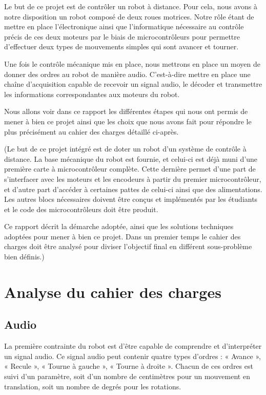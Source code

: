Le but de ce projet est de contrôler un robot à distance. Pour cela, nous avons à notre disposition un robot composé de deux roues motrices. Notre rôle étant de mettre en place l’électronique ainsi que l’informatique nécessaire au contrôle précis de ces deux moteurs par le biais de microcontrôleurs pour permettre d’effectuer deux types de mouvements simples qui sont avancer et tourner. 

Une fois le contrôle mécanique mis en place, nous mettrons en place un moyen de donner des ordres au robot de manière audio. C’est-à-dire mettre en place une chaîne d’acquisition capable de recevoir un signal audio, le décoder et transmettre les informations correspondantes aux moteurs du robot. 

Nous allons voir dans ce rapport les différentes étapes qui nous ont permis de mener à bien ce projet ainsi que les choix que nous avons fait pour répondre le plus précisément au cahier des charges détaillé ci-après. 


(Le but de ce projet intégré est de doter un robot d'un système de contrôle à distance. La base mécanique du robot est fournie, et celui-ci est déjà muni d'une première carte à microcontrôleur complète. Cette dernière permet d'une part de s'interfacer avec les moteurs et les encodeurs à partir du premier microcontrôleur, et d'autre part d'accéder à certaines pattes de celui-ci ainsi que des alimentations. Les autres blocs nécessaires doivent être conçus et implémentés par les étudiants et le code des microcontrôleurs doit être produit.

Ce rapport décrit la démarche adoptée, ainsi que les solutions techniques adoptées pour mener à bien ce projet. Dans un premier temps le cahier des charges doit être analysé pour diviser l'objectif final en différent sous-problème bien définis.)

\newpage

\section{Analyse du cahier des charges}

\subsection{Audio}

La première contrainte du robot est d’être capable de comprendre et d’interpréter un signal audio. Ce signal audio peut contenir quatre types d’ordres : « Avance », « Recule », « Tourne à gauche », « Tourne à droite ». Chacun de ces ordres est suivi d’un paramètre, soit d’un nombre de centimètres pour un mouvement en translation, soit un nombre de degrés pour les rotations. 

